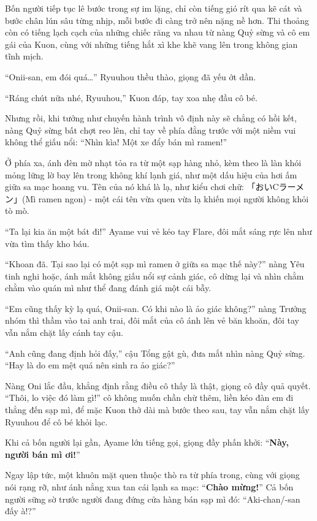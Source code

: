 \documentclass[../main.tex]{subfiles}
\begin{document}
Bốn người tiếp tục lê bước trong sự im lặng, chỉ còn tiếng gió rít qua kẽ cát và bước chân lún sâu từng nhịp, mỗi bước đi càng trở nên nặng nề hơn. Thi thoảng còn có tiếng lạch cạch của những chiếc răng va nhau từ nàng Quỷ sừng và cô em gái của Kuon, cùng với những tiếng hắt xì khe khẽ vang lên trong không gian tĩnh mịch.

``Onii-san, em đói quá\dots'' Ryuuhou thều thào, giọng đã yếu ớt dần.

``Ráng chút nữa nhé, Ryuuhou,'' Kuon đáp, tay xoa nhẹ đầu cô bé.

Nhưng rồi, khi tưởng như chuyến hành trình vô định này sẽ chẳng có hồi kết, nàng Quỷ sừng bất chợt reo lên, chỉ tay về phía đằng trước với một niềm vui không thể giấu nổi: ``Nhìn kìa! Một xe đẩy bán mì ramen!''


Ở phía xa, ánh đèn mờ nhạt tỏa ra từ một sạp hàng nhỏ, kèm theo là làn khói mỏng lững lờ bay lên trong không khí lạnh giá, như một dấu hiệu của hơi ấm giữa sa mạc hoang vu. Tên của nó khá là lạ, như kiểu chơi chữ: 「{\fotskip おいCラーメン}」(Mì ramen ngon) - một cái tên vừa quen vừa lạ khiến mọi người không khỏi tò mò.

``Ta lại kia ăn một bát đi!'' Ayame vui vẻ kéo tay Flare, đôi mắt sáng rực lên như vừa tìm thấy kho báu.

``Khoan đã. Tại sao lại có một sạp mì ramen ở giữa sa mạc thế này?'' nàng Yêu tinh nghi hoặc, ánh mắt không giấu nổi sự cảnh giác, cô dừng lại và nhìn chằm chằm vào quán mì như thể đang đánh giá một cái bẫy.

``Em cũng thấy kỳ lạ quá, Onii-san. Có khi nào là ảo giác không?'' nàng Trưởng nhóm thì thầm vào tai anh trai, đôi mắt của cô ánh lên vẻ băn khoăn, đôi tay vẫn nắm chặt lấy cánh tay cậu.

``Anh cũng đang định hỏi đấy,'' cậu Tổng gật gù, đưa mắt nhìn nàng Quỷ sừng. ``Hay là do em mệt quá nên sinh ra ảo giác?''

Nàng Oni lắc đầu, khẳng định rằng điều cô thấy là thật, giọng cô đầy quả quyết. ``Thôi, lo việc đó làm gì!'' cô không muốn chần chừ thêm, liền kéo đàn em đi thẳng đến sạp mì, để mặc Kuon thở dài mà bước theo sau, tay vẫn nắm chặt lấy Ryuuhou để cô bé khỏi lạc.

\ct

Khi cả bốn người lại gần, Ayame lớn tiếng gọi, giọng đầy phấn khởi: ``\textbf{Này, người bán mì ơi!}''

Ngay lập tức, một khuôn mặt quen thuộc thò ra từ phía trong, cùng với giọng nói rạng rỡ, như ánh nắng xua tan cái lạnh sa mạc: ``\textbf{Chào mừng!}'' Cả bốn người sững sờ trước người đang đứng cửa hàng bán sạp mì đó: ``Aki-chan/-san đấy à!?''
\end{document}
